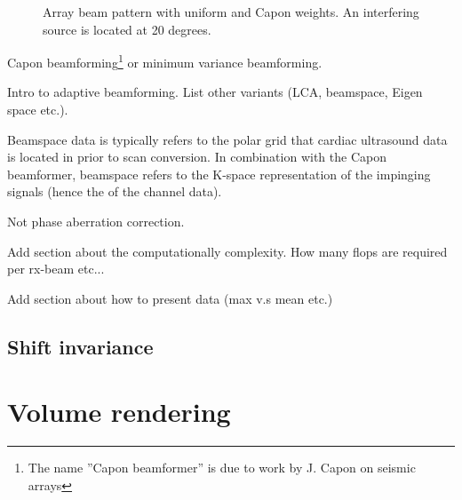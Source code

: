 \begin{figure}[t!]
\caption{Array beam pattern with uniform and Capon weights. An interfering source is located at 20 degrees.}
\end{figure}

Capon beamforming\footnote{The name ''Capon beamformer'' is due to work by J. Capon  on seismic arrays } or minimum variance beamforming.

Intro to adaptive beamforming. List other variants (LCA, beamspace, Eigen space etc.). 

Beamspace data is typically refers to the polar grid that cardiac ultrasound data is located in prior to scan conversion. In combination with the Capon beamformer, beamspace refers to the K-space representation of the impinging signals (hence the  of the channel data). 

Not phase aberration correction.

Add section about the computationally complexity. How many flops are required per rx-beam etc...

Add section about how to present data (max v.s mean etc.)
						
\subsection{Shift invariance}

\section{Volume rendering}\label{sec:volren}

